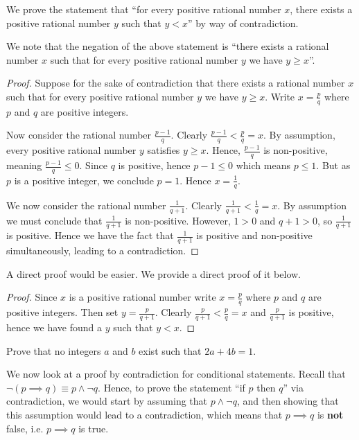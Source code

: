 \begin{example}
    We prove the statement that ``for every positive rational number $x$, there exists a positive rational number $y$ such that $y < x$'' by way of contradiction.

    We note that the negation of the above statement is ``there exists a rational number $x$ such that for every positive rational number $y$ we have $y \geq x$''.
    \begin{proof}
        Suppose for the sake of contradiction that there exists a rational number $x$ such that for every positive rational number $y$ we have $y \geq x$. Write $x = \frac pq$ where $p$ and $q$ are positive integers.

        Now consider the rational number $\frac{p-1}{q}$. Clearly $\frac{p-1}{q} < \frac pq = x$. By assumption, every positive rational number $y$ satisfies $y \geq x$. Hence, $\frac{p-1}{q}$ is non-positive, meaning $\frac{p-1}{q} \leq 0$. Since $q$ is positive, hence $p - 1 \leq 0$ which means $p \leq 1$. But as $p$ is a positive integer, we conclude $p = 1$. Hence $x = \frac 1q$.

        We now consider the rational number $\frac{1}{q+1}$. Clearly $\frac{1}{q+1} < \frac{1}{q} = x$. By assumption we must conclude that $\frac{1}{q+1}$ is non-positive. However, $1 > 0$ and $q + 1 > 0$, so $\frac{1}{q+1}$ is positive. Hence we have the fact that $\frac{1}{q+1}$ is positive and non-positive simultaneously, leading to a contradiction.
    \end{proof}
\end{example}
\begin{remark}
    A direct proof would be easier. We provide a direct proof of it below.
    \begin{proof}
        Since $x$ is a positive rational number write $x = \frac pq$ where $p$ and $q$ are positive integers. Then set $y = \frac{p}{q+1}$. Clearly $\frac{p}{q+1} < \frac{p}{q} = x$ and $\frac{p}{q+1}$ is positive, hence we have found a $y$ such that $y < x$.
    \end{proof}
\end{remark}

\begin{exercise}
    Prove that no integers $a$ and $b$ exist such that $2a + 4b = 1$.
\end{exercise}

We now look at a proof by contradiction for conditional statements. Recall that $\lnot(p \implies q) \equiv p \land \lnot q$. Hence, to prove the statement ``if $p$ then $q$'' via contradiction, we would start by assuming that $p \land \lnot q$, and then showing that this assumption would lead to a contradiction, which means that $p \implies q$ is \textbf{not} false, i.e. $p \implies q$ is true.

